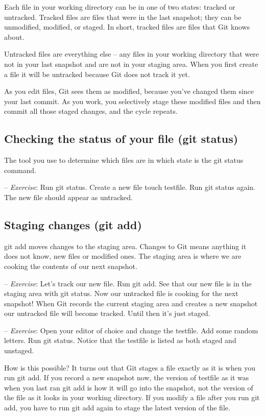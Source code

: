 \documentclass[12pt,a4]{article}
\newcommand{\ilcode}[1]{\textcolor[RGB]{160, 110, 220}{#1}}
\begin{document}
Each file in your working directory can be in one of two states: tracked or
untracked. Tracked files are files that were in the last snapshot; they can be
unmodified, modified, or staged. In short, tracked files are files that Git
knows about.

Untracked files are everything else -- any files in your working directory that
were not in your last snapshot and are not in your staging area. When you first
create a file it will be untracked because Git does not track it yet.

As you edit files, Git sees them as modified, because you’ve changed them since
your last commit. As you work, you selectively stage these modified files and
then commit all those staged changes, and the cycle repeats.

\subsection{Checking the status of your file (git status)}
The tool you use to determine which files are in which state is the \ilcode{git
status} command.

{\sf -- \emph{Exercise}:} Run \ilcode{git status}. Create a new file
\ilcode{touch testfile}. Run \ilcode{git status} again. The new file should
appear as \ilcode{untracked}.

\subsection{Staging changes (git add)}
\ilcode{git add} moves changes to the staging area. Changes to Git means
anything it does not know, new files or modified ones. The staging area is where
we are cooking the contents of our next snapshot.

{\sf -- \emph{Exercise}:} Let's track our new file. Run \ilcode{git add}. See
that our new file is in the staging area with \ilcode{git status}. Now our
untracked file is cooking for the next snapshot! When Git records the current
staging area and creates a new snapshot our untracked file will become tracked.
Until then it's just staged.

{\sf -- \emph{Exercise}:} Open your editor of choice and change the testfile.
Add some random letters. Run \ilcode{git status}. Notice that the testfile is
listed as both staged and unstaged.

How is this possible? It turns out that Git stages a file exactly as it is when
you run \ilcode{git add}. If you record a new snapshot now, the version of
testfile as it was when you last ran \ilcode{git add} is how it will go into the
snapshot, not the version of the file as it looks in your working directory. If
you modify a file after you run \ilcode{git add}, you have to run \ilcode{git
add} again to stage the latest version of the file.
\end{document}
